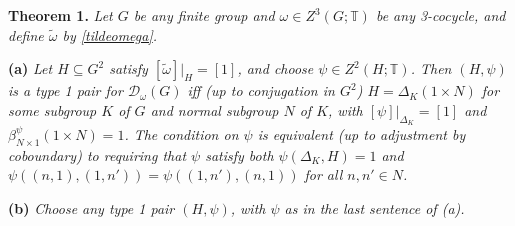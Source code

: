 \documentclass[12pt]{article}
\numberwithin{equation}{section}
\def\cD            {{\mathcal{D}}}
\def\bbT           {\mathbb{T}}
\begin{document}
\medskip\noindent\textbf{Theorem 1.} \textit{Let $G$ be any finite group and $\omega\in Z^3(G;\bbT)$ be any 3-cocycle, and define $\widetilde{\omega}$ by \eqref{tildeomega}.}

\medskip\noindent\textbf{(a)} \textit{Let $H\subseteq G^2$ satisfy $[\widetilde{\omega}]|_H=[1]$, and choose $\psi\in Z^2(H;\bbT)$. Then $(H,\psi)$  is a type 1 pair for $\cD_\omega(G)$ iff (up to conjugation in $G^2$) $H=\Delta_K(1\times N)$ for some subgroup $K$ of $G$ and normal subgroup  $N$ of $K$, with $[\psi]|_{\Delta_K}=[1]$ and $\beta^\psi_{N\times 1}(1\times N)=1$. The condition on $\psi$ is equivalent (up to adjustment by coboundary) to requiring that $\psi$  satisfy both $\psi(\Delta_K,H)=1$
and $\psi((n,1),(1,n'))=\psi((1,n'),(n,1))$ for all $n,n'\in N$.}  



 \medskip\noindent\textbf{(b)}  \textit{Choose any type 1 pair $(H,\psi)$, with $\psi$ as in the last sentence of (a).}
 
\end{document}
